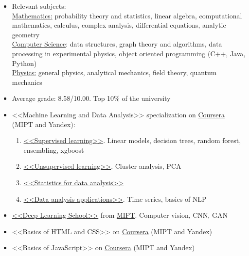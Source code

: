 

\begin{itemize}
	\item Relevant subjects: \\
	\underline{Mathematics:} probability theory and statistics, linear algebra, computational mathematics, calculus, complex analysis, differential equations, analytic geometry\\
	\underline{Computer Science}: data structures, graph theory and algorithms, data processing in experimental physics, object oriented programming (C++, Java, Python)\\
	\underline{Physics:} general physics, analytical mechanics, field theory, quantum mechanics\\
	\item Average grade: 8.58/10.00. Top 10\% of the university
\end{itemize}


\begin{itemize}
\item <<Machine Learning and Data Analysis>> specialization on \href{https://www.coursera.org/specializations/machine-learning-data-analysis?}{\underline{Coursera}} (MIPT and Yandex):
\begin{enumerate}
	\item \href{https://www.coursera.org/learn/supervised-learning?specialization=machine-learning-data-analysis}{<<Supervised learning>>}. Linear models, decision trees, random forest, ensembling, xgboost
	\item \href{https://www.coursera.org/learn/unsupervised-learning?specialization=machine-learning-data-analysis}{<<Unsupervised learning>>}. Cluster analysis, PCA
	\item \href{https://www.coursera.org/learn/stats-for-data-analysis/}{<<Statistics for data analysis>>}
	\item \href{https://www.coursera.org/learn/data-analysis-applications/}{<<Data analysis applications>>}. Time series, basics of NLP
\end{enumerate}


\divider
\item \href{https://en.dlschool.org/}{<<Deep Learning School>>} from \href{https::/mipt.ru/en}{\underline{MIPT}}. Computer vision, CNN, GAN
\item <<Basics of HTML and CSS>> on \href{https://www.coursera.org/learn/snovy-html-i-css?specialization=razrabotka-interfeysov}{\underline{Coursera}} (MIPT and Yandex)
\item <<Basics of JavaScript>> on \href{https://www.coursera.org/learn/javascript-osnovy-i-funktsii}{\underline{Coursera}} (MIPT and Yandex)

\end{itemize}



